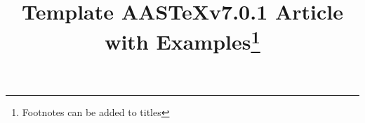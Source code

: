 \documentclass[linenumbers,trackchanges]{aastex701}
\newcommand\aastex{AAS\TeX}
\begin{document}
\title{Template \aastex v7.0.1 Article with Examples\footnote{Footnotes can be added to titles}}

\end{document}
